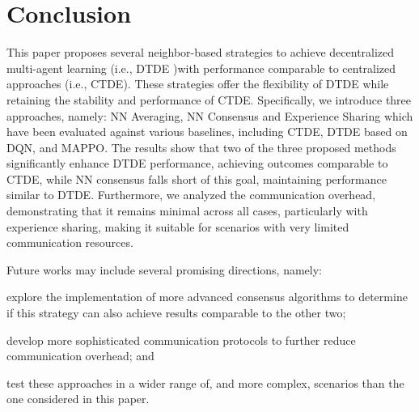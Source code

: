 \documentclass[sigconf]{acmart}
\begin{document}
\section{Conclusion}\label{sec:conclusion}
This paper proposes several neighbor-based strategies to achieve decentralized multi-agent learning (i.e., DTDE )with performance 
 comparable to centralized approaches (i.e., CTDE). 
%
These strategies offer the flexibility of DTDE while retaining the stability and performance of CTDE. 
%
Specifically, we introduce three approaches, namely: NN Averaging, NN Consensus and Experience Sharing
 which have been evaluated against various baselines, including CTDE, DTDE based on DQN, and MAPPO. 
%
The results show that two of the three proposed methods significantly enhance DTDE performance, achieving outcomes comparable 
 to CTDE, while NN consensus falls short of this goal, maintaining performance similar to DTDE. 
%
Furthermore, we analyzed the communication overhead, demonstrating that it remains minimal across all cases, 
 particularly with experience sharing, making it suitable for scenarios with very limited communication resources.

Future works may include several promising directions, namely:
\begin{enumerate*}[label=(\roman*)]
  \item explore the implementation of more advanced consensus algorithms to determine if this strategy can also achieve 
   results comparable to the other two;
  \item develop more sophisticated communication protocols to further reduce communication overhead; and
  \item test these approaches in a wider range of, and more complex, scenarios than the one considered in this paper.
\end{enumerate*} 



 
\end{document}
